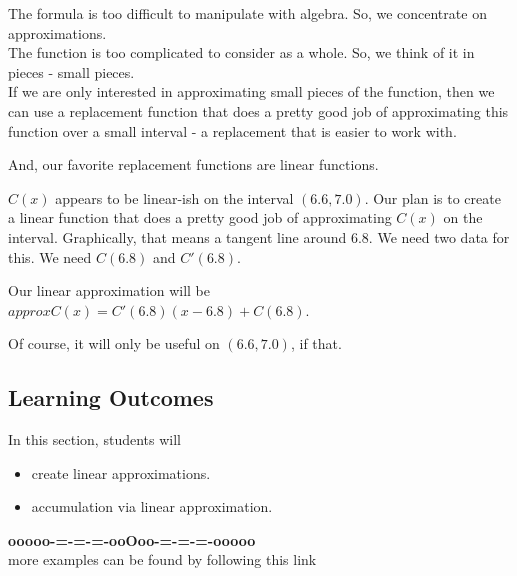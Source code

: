 \documentclass{ximera}
\begin{document}
The formula is too difficult to manipulate with algebra.  So, we concentrate on approximations. \\ 


The function is too complicated to consider as a whole. So, we think of it in pieces - small pieces. \\






If we are only interested in approximating small pieces of the function, then we can use a replacement function that does a pretty good job of approximating this function over a small interval - a replacement that is easier to work with.

And, our favorite replacement functions are linear functions.


$C(x)$ appears to be linear-ish on the interval $(6.6, 7.0)$. Our plan is to create a linear function that does a pretty good job of approximating $C(x)$ on the interval. Graphically, that means a tangent line around $6.8$.  We need two data for this.  We need $C(6.8)$ and $C'(6.8)$.





Our linear approximation will be $approxC(x) = C'(6.8)(x-6.8) + C(6.8)$.

Of course, it will only be useful on $(6.6, 7.0)$, if that.






\subsection*{Learning Outcomes}


\begin{sectionOutcomes}
In this section, students will 

\begin{itemize}
\item create linear approximations.
\item accumulation via linear approximation.
\end{itemize}
\end{sectionOutcomes}










\begin{center}
\textbf{\textcolor{green!50!black}{ooooo-=-=-=-ooOoo-=-=-=-ooooo}} \\

more examples can be found by following this link\\ 

\end{center}
\end{document}
